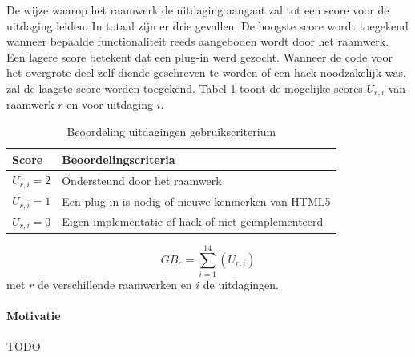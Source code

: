 De wijze waarop het raamwerk de uitdaging aangaat zal tot een score voor de uitdaging leiden.
In totaal zijn er drie gevallen.
De hoogste score wordt toegekend wanneer bepaalde functionaliteit reeds aangeboden wordt door het raamwerk. 
Een lagere score betekent dat een plug-in werd gezocht. 
Wanneer de code voor het overgrote deel zelf diende geschreven te worden of een hack noodzakelijk was, zal de laagste score worden toegekend.
Tabel \ref{tabel:scores-uitdagingen} toont de mogelijke scores $U_{r,i}$ van raamwerk $r$ en voor uitdaging $i$.
\begin{table}[h]	
  \centering
  \begin{tabular}{ll}
    \toprule
    \textbf{Score} & \textbf{Beoordelingscriteria}\\
    \midrule
    $U_{r,i} = 2$ & Ondersteund door het raamwerk\\
    $U_{r,i} = 1$ & Een plug-in is nodig of nieuwe kenmerken van HTML5\\ %
    $U_{r,i} = 0$ & Eigen implementatie of hack of niet geïmplementeerd\\ %
    \bottomrule
  \end{tabular}
  \caption{Beoordeling uitdagingen gebruikscriterium}
  \label{tabel:scores-uitdagingen}
\end{table}
\begin{equation}
  GB_r = \sum_{i=1}^{14}{\left(U_{r,i}\right)}
  \label{eq:gebruik}
\end{equation}
met $r$ de verschillende raamwerken en $i$ de uitdagingen.

\paragraph{Motivatie}
TODO


